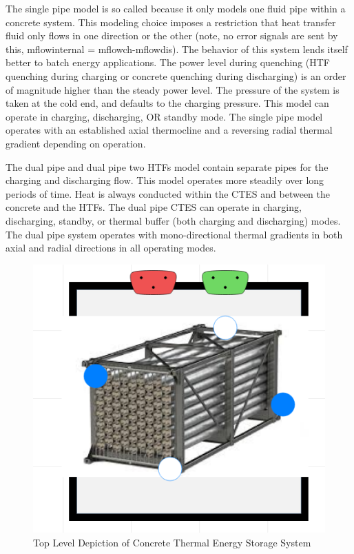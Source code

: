 The single pipe model is so called because it only models one fluid pipe within a concrete system. This modeling choice imposes a restriction that heat transfer fluid only flows in one direction or the other (note, no error signals are sent by this, m\textunderscore flow\textunderscore internal = m\textunderscore flow\textunderscore ch-m\textunderscore flow\textunderscore dis). The behavior of this system lends itself better to batch energy applications. The power level during quenching (HTF quenching during charging or concrete quenching during discharging) is an order of magnitude higher than the steady power level. The pressure of the system is taken at the cold end, and defaults to the charging pressure. This model can operate in charging, discharging, OR standby mode. The single pipe model operates with an established axial thermocline and a reversing radial thermal gradient depending on operation. 

The dual pipe and dual pipe two HTFs model contain separate pipes for the charging and discharging flow. This model operates more steadily over long periods of time. Heat is always conducted within the CTES and between the concrete and the HTFs. The dual pipe CTES can operate in charging, discharging, standby, or thermal buffer (both charging and discharging) modes. The dual pipe system operates with mono-directional thermal gradients in both axial and radial directions in all operating modes. 


\begin{figure}[hbtp]
\centering
\includegraphics[scale=0.8]{pics/CTES.png}
\caption{Top Level Depiction of Concrete Thermal Energy Storage System}
\label{CTES}
\end{figure}

%
